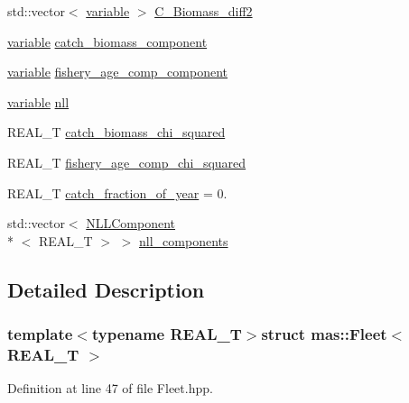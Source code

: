 \begin{DoxyCompactItemize}
\item 
std\-::vector$<$ \hyperlink{structmas_1_1_fleet_a1902d0842cb7ce9b9bdd4be013e709a9}{variable} $>$ \hyperlink{structmas_1_1_fleet_a9851fff6a635dce825730a1218361b35}{C\-\_\-\-Biomass\-\_\-diff2}
\item 
\hyperlink{structmas_1_1_fleet_a1902d0842cb7ce9b9bdd4be013e709a9}{variable} \hyperlink{structmas_1_1_fleet_a205664ab22c0904b56ee4700ae011a8d}{catch\-\_\-biomass\-\_\-component}
\item 
\hyperlink{structmas_1_1_fleet_a1902d0842cb7ce9b9bdd4be013e709a9}{variable} \hyperlink{structmas_1_1_fleet_abff6202073d68fa9699506af85b124b3}{fishery\-\_\-age\-\_\-comp\-\_\-component}
\item 
\hyperlink{structmas_1_1_fleet_a1902d0842cb7ce9b9bdd4be013e709a9}{variable} \hyperlink{structmas_1_1_fleet_a36c9122dc2cb7bb8bf4d2a060c001f2a}{nll}
\item 
R\-E\-A\-L\-\_\-\-T \hyperlink{structmas_1_1_fleet_a1dfe358f8efd67a467f70b3a87d49e51}{catch\-\_\-biomass\-\_\-chi\-\_\-squared}
\item 
R\-E\-A\-L\-\_\-\-T \hyperlink{structmas_1_1_fleet_a3eed643265324852c1b411a75d68cf21}{fishery\-\_\-age\-\_\-comp\-\_\-chi\-\_\-squared}
\item 
R\-E\-A\-L\-\_\-\-T \hyperlink{structmas_1_1_fleet_a441dfd7f3172ab329520882e66669ddd}{catch\-\_\-fraction\-\_\-of\-\_\-year} = 0.
\item 
std\-::vector$<$ \hyperlink{structmas_1_1_n_l_l_component}{N\-L\-L\-Component}\\*
$<$ R\-E\-A\-L\-\_\-\-T $>$ $>$ \hyperlink{structmas_1_1_fleet_a41686751b90e9c47278be5df82eb0f3c}{nll\-\_\-components}
\end{DoxyCompactItemize}


\subsection{Detailed Description}
\subsubsection*{template$<$typename R\-E\-A\-L\-\_\-\-T$>$struct mas\-::\-Fleet$<$ R\-E\-A\-L\-\_\-\-T $>$}



Definition at line 47 of file Fleet.\-hpp.



